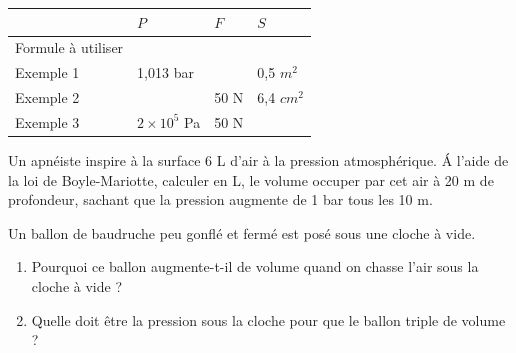 \documentclass[11pt,a4paper]{article}
\newcommand{\cadreblanc}[1]{%
\medskip\framebox[\linewidth][c]{%
\rule{0mm}{#1mm}}\par
\medskip}
\renewcommand{\arraystretch}{2}
\begin{document}
\newpage


\begin{center}

    \renewcommand{\arraystretch}{3}


    \begin{tabular}{|p{4cm}|C{3cm}|C{3cm}|C{3cm}|}
         \hline
       & $P$ & $F$ & $S$ \\
         \hline 
               Formule à  utiliser & &  & \\
         \hline 
         Exemple 1 &  1,013 bar  & & 0,5 $m^2$\\
         \hline
         Exemple 2 &  & 50 N & 6,4 $cm^2$ \\
         \hline 
         Exemple 3 & $2 \times 10^5$ Pa & 50 N & \\
         \hline
         

    \end{tabular}\end{center}

    \vfill 



\vspace{-3mm}

\noindent%
\begin{minipage}{.36\textwidth}%
Un apnéiste inspire à la surface 6 L d'air à la pression atmosphérique. \'A l'aide de la loi de Boyle-Mariotte, calculer en L, le volume occuper par cet air à 20 m de profondeur, sachant que la pression augmente de 1 bar tous les 10 m.  

\end{minipage}%
\hfill
\begin{minipage}{.53\textwidth}%
\cadreblanc{40}
\end{minipage}%

\vfill 

\vfill 



Un ballon de baudruche peu gonflé et fermé est posé sous une cloche à vide. 

\begin{enumerate}
    \item Pourquoi ce ballon augmente-t-il de volume quand on chasse l'air sous la cloche à vide ? \\[2mm]
    \cadreblanc{15}
    \item Quelle doit être la pression sous la cloche pour que le ballon triple de volume ? \\[2mm]
    \cadreblanc{20}
\end{enumerate}


\vfill 
\end{document}
